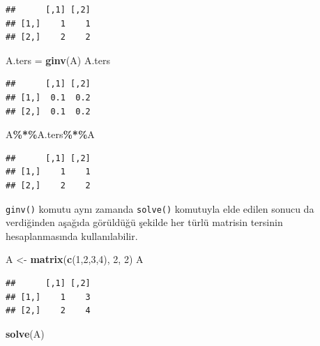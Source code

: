 \documentclass[
]{book}
\newenvironment{Shaded}{\begin{snugshade}}{\end{snugshade}}
\newcommand{\DecValTok}[1]{\textcolor[rgb]{0.00,0.00,0.81}{#1}}
\newcommand{\FunctionTok}[1]{\textcolor[rgb]{0.13,0.29,0.53}{\textbf{#1}}}
\newcommand{\NormalTok}[1]{#1}
\newcommand{\OtherTok}[1]{\textcolor[rgb]{0.56,0.35,0.01}{#1}}
\newcommand{\SpecialCharTok}[1]{\textcolor[rgb]{0.81,0.36,0.00}{\textbf{#1}}}
\begin{document}
\begin{verbatim}
##      [,1] [,2]
## [1,]    1    1
## [2,]    2    2
\end{verbatim}

\begin{Shaded}
\begin{Highlighting}[]
\NormalTok{ A.ters }\OtherTok{=} \FunctionTok{ginv}\NormalTok{(A)}
\NormalTok{ A.ters}
\end{Highlighting}
\end{Shaded}

\begin{verbatim}
##      [,1] [,2]
## [1,]  0.1  0.2
## [2,]  0.1  0.2
\end{verbatim}

\begin{Shaded}
\begin{Highlighting}[]
\NormalTok{ A}\SpecialCharTok{\%*\%}\NormalTok{A.ters}\SpecialCharTok{\%*\%}\NormalTok{A}
\end{Highlighting}
\end{Shaded}

\begin{verbatim}
##      [,1] [,2]
## [1,]    1    1
## [2,]    2    2
\end{verbatim}

\texttt{ginv()} komutu aynı zamanda \texttt{solve()} komutuyla elde edilen sonucu da verdiğinden aşağıda görüldüğü şekilde her türlü matrisin tersinin hesaplanmasında kullanılabilir.

\begin{Shaded}
\begin{Highlighting}[]
\NormalTok{ A }\OtherTok{\textless{}{-}} \FunctionTok{matrix}\NormalTok{(}\FunctionTok{c}\NormalTok{(}\DecValTok{1}\NormalTok{,}\DecValTok{2}\NormalTok{,}\DecValTok{3}\NormalTok{,}\DecValTok{4}\NormalTok{), }\DecValTok{2}\NormalTok{, }\DecValTok{2}\NormalTok{) }
\NormalTok{ A }
\end{Highlighting}
\end{Shaded}

\begin{verbatim}
##      [,1] [,2]
## [1,]    1    3
## [2,]    2    4
\end{verbatim}

\begin{Shaded}
\begin{Highlighting}[]
 \FunctionTok{solve}\NormalTok{(A) }
\end{Highlighting}
\end{Shaded}
\end{document}
